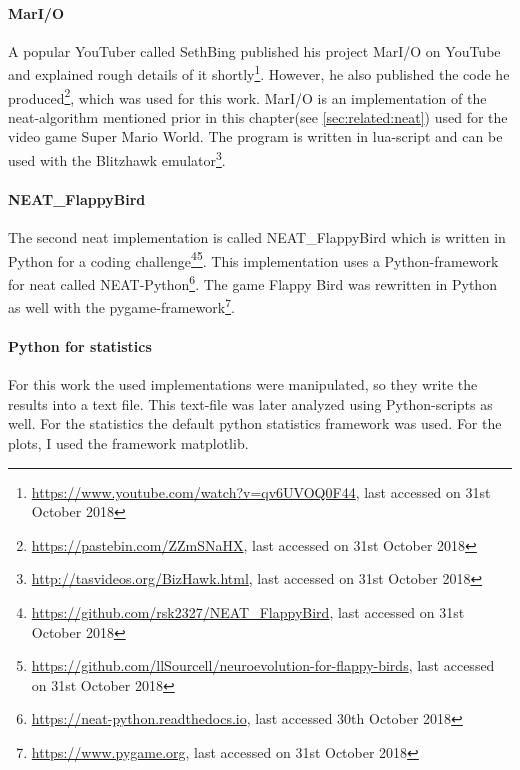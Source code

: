\paragraph{MarI/O}
A popular YouTuber called SethBing published his project MarI/O on YouTube and explained rough details of it shortly\footnote{\url{https://www.youtube.com/watch?v=qv6UVOQ0F44}, last accessed on 31st October 2018}. However, he also published the code he produced\footnote{\url{https://pastebin.com/ZZmSNaHX}, last accessed on 31st October 2018}, which was used for this work. MarI/O is an implementation of the \gls{neat}-algorithm mentioned prior in this chapter(see \ref{sec:related:neat}) used for the video game Super Mario World. The program is written in \gls{lua}-script and can be used with the Blitzhawk emulator\footnote{\url{http://tasvideos.org/BizHawk.html}, last accessed on 31st October 2018}. 
\paragraph{NEAT\_FlappyBird}
The second \gls{neat} implementation is called NEAT\_FlappyBird which is written in Python for a coding challenge\footnote{\url{https://github.com/rsk2327/NEAT_FlappyBird}, last accessed on 31st October 2018}\footnote{\url{https://github.com/llSourcell/neuroevolution-for-flappy-birds}, last accessed on 31st October 2018}. This implementation uses a Python-framework for \gls{neat} called NEAT-Python\footnote{\url{https://neat-python.readthedocs.io}, last accessed 30th October 2018}. The game Flappy Bird was rewritten in Python as well with the pygame-framework\footnote{\url{https://www.pygame.org}, last accessed on 31st October 2018}.
\paragraph{Python for statistics}
For this work the used implementations were manipulated, so they write the results into a text file. This text-file was later analyzed using Python-scripts as well. For the statistics the default python statistics framework was used. For the plots, I used the framework matplotlib.

